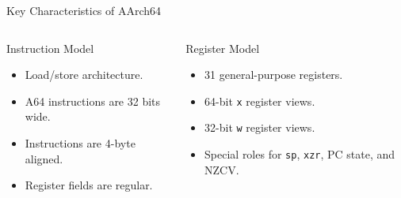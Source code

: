 \documentclass[aspectratio=169,11pt,t]{beamer}
\newcommand{\code}[1]{\texttt{#1}}
\begin{document}
\begin{frame}{Key Characteristics of AArch64}

\begin{columns}[T,onlytextwidth]


\begin{block}{Instruction Model}
\begin{itemize}
  \item Load/store architecture.
  \item A64 instructions are 32 bits wide.
  \item Instructions are 4-byte aligned.
  \item Register fields are regular.
\end{itemize}
\end{block}


\begin{block}{Register Model}
\begin{itemize}
  \item 31 general-purpose registers.
  \item 64-bit \code{x} register views.
  \item 32-bit \code{w} register views.
  \item Special roles for
        \code{sp},
        \code{xzr},
        PC state,
        and NZCV.
\end{itemize}
\end{block}

\end{columns}

\end{frame}



\end{document}

